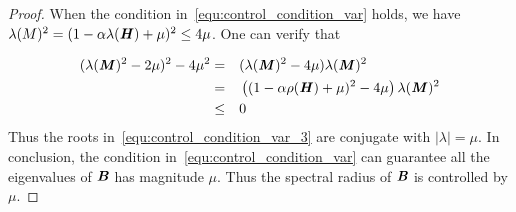 \begin{lemma}
\begin{proof}
	When the condition in~\eqref{equ:control_condition_var} holds, we have $\lambda(M)^2=(1 - \alpha \lambda(\bm{\mathit{H}}) + \mu)^2 \leq 4\mu$. One can verify that 
	
	\begin{equation}
		\begin{aligned}
			(\lambda(\bm{\mathit{M}})^2 - 2\mu)^2 - 4\mu^2 & = && (\lambda(\bm{\mathit{M}})^2 - 4\mu)\lambda(\bm{\mathit{M}})^2 \\
			& = &&\left( (1 - \alpha \rho(\bm{\mathit{H}} ) + \mu)^2 - 4\mu\right)\lambda(\bm{\mathit{M}})^2 \\
			& \leq && 0
		\end{aligned}
	\end{equation}
	Thus the roots in~\eqref{equ:control_condition_var_3} are conjugate with $| \lambda | = \mu$. In conclusion, the condition in~\eqref{equ:control_condition_var} can guarantee all the eigenvalues of $\bm{\mathit{B}}$ has magnitude $\mu$. Thus the spectral radius of $\bm{\mathit{B}}$ is controlled by $\mu$.
\end{proof}

\end{lemma}


